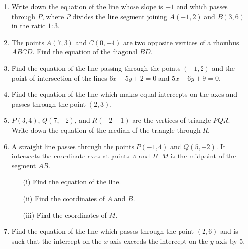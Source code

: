 \documentclass[12pt]{article}
\begin{document}
\begin{multicols}{2}
\begin{enumerate}
		\item Write down the equation of the line whose slope is \(-1\) and which passes through \( P \), where \( P \) divides the line segment joining \( A(-1, 2) \) and \( B(3, 6) \) in the ratio \( 1:3 \).
		\item The points \( A(7, 3) \) and \( C(0, -4) \) are two opposite vertices of a rhombus \( ABCD \). Find the equation of the diagonal \( BD \).
		\item Find the equation of the line passing through the points \( (-1, 2) \) and the point of intersection of the lines \( 6x - 5y + 2 = 0 \) and \( 5x - 6y + 9 = 0 \).
		\item Find the equation of the line which makes equal intercepts on the axes and passes through the point \( (2, 3) \).
		\item \( P(3, 4) \), \( Q(7, -2) \), and \( R(-2, -1) \) are the vertices of triangle \( PQR \). Write down the equation of the median of the triangle through \( R \).
	
	 \item A straight line passes through the points \( P(-1, 4) \) and \( Q(5, -2) \). It intersects the coordinate axes at points \( A \) and \( B \). \( M \) is the midpoint of the segment \( AB \).
	\begin{enumerate}
		\item[(i)] Find the equation of the line.
		\item[(ii)] Find the coordinates of \( A \) and \( B \).
		\item[(iii)] Find the coordinates of \( M \).
	\end{enumerate}
	
	\item Find the equation of the line which passes through the point \( (2, 6) \) and is such that the intercept on the \( x \)-axis exceeds the intercept on the \( y \)-axis by 5.
	
	\end{enumerate}
	\end{multicols}
	\center{******************}
	
\end{document}
